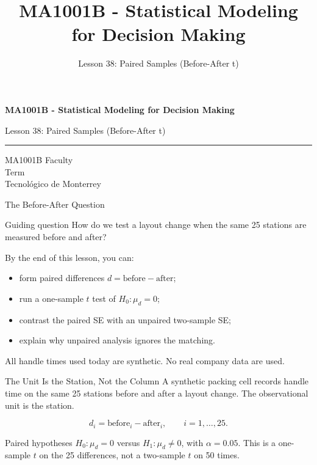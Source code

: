 \documentclass[aspectratio=169,10pt,english]{beamer}
\title{MA1001B - Statistical Modeling for Decision Making}
\subtitle{Lesson 38: Paired Samples (Before-After t)}
\author{}
\institute{Tecnol\'ogico de Monterrey}
\date{}
\begin{document}
\begin{frame}[plain]
  \vspace{1.2cm}
  {\Large\bfseries MA1001B - Statistical Modeling for Decision Making\par}
  \vspace{0.7cm}
  {\large Lesson 38: Paired Samples (Before-After t)\par}
  \vspace{0.7cm}
  {\color{TecRojo}\rule{\textwidth}{1.2pt}}
  \vspace{0.8cm}

  MA1001B Faculty\\[0.3cm]
  Term\\[0.3cm]
  Tecnol\'ogico de Monterrey
\end{frame}

\begin{frame}{The Before-After Question}
  \begin{alertblock}{Guiding question}
    How do we test a layout change when the same 25 stations are measured
    before and after?
  \end{alertblock}

  \vspace{0.6em}
  By the end of this lesson, you can:
  \begin{itemize}
    \item form paired differences $d=\text{before}-\text{after}$;
    \item run a one-sample $t$ test of $H_0:\mu_d=0$;
    \item contrast the paired SE with an unpaired two-sample SE;
    \item explain why unpaired analysis ignores the matching.
  \end{itemize}

  \vfill
  \scriptsize All handle times used today are synthetic. No real company data are used.
\end{frame}

\begin{frame}{The Unit Is the Station, Not the Column}
  \small
  A synthetic packing cell records handle time on the same 25 stations
  before and after a layout change. The observational unit is the station.

  \[
    d_i = \text{before}_i - \text{after}_i,\qquad i=1,\ldots,25.
  \]

  \begin{exampleblock}{Paired hypotheses}
    $H_0:\mu_d=0$ versus $H_1:\mu_d\neq 0$, with $\alpha=0.05$. This is a
    one-sample $t$ on the 25 differences, not a two-sample $t$ on 50 times.
  \end{exampleblock}
\end{frame}
\end{document}
